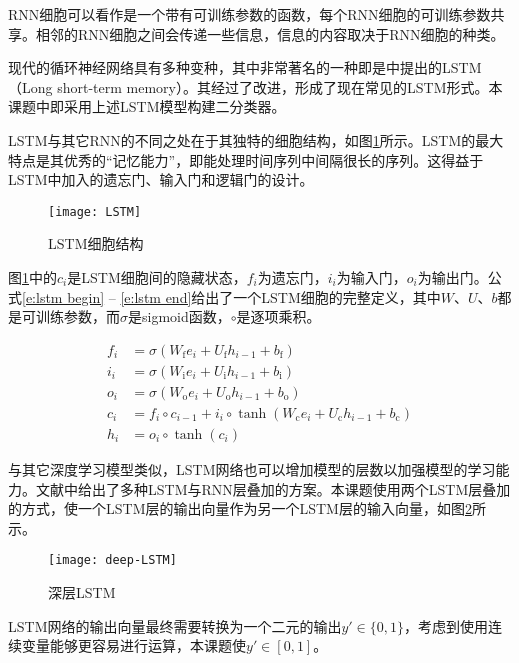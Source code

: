 RNN细胞可以看作是一个带有可训练参数的函数，每个RNN细胞的可训练参数共享。相邻的RNN细胞之间会传递一些信息，信息的内容取决于RNN细胞的种类。

\label{s:classifer lstm}
现代的循环神经网络具有多种变种，其中非常著名的一种即是\cite{Hochreiter1997}中提出的LSTM（Long short-term memory）。其经过了\cite{Gers2000}改进，形成了现在常见的LSTM形式。本课题中即采用上述LSTM模型构建二分类器。

LSTM与其它RNN的不同之处在于其独特的细胞结构，如图\ref{f:lstm}所示。LSTM的最大特点是其优秀的“记忆能力”，即能处理时间序列中间隔很长的序列。这得益于LSTM中加入的遗忘门、输入门和逻辑门的设计。

\begin{figure}[h]
	\centering
	\texttt{[image: LSTM]}
	\caption{LSTM细胞结构}
	\label{f:lstm}
	\vspace{-1em}
\end{figure}

图\ref{f:lstm}中的$c_i$是LSTM细胞间的隐藏状态，$f_i$为遗忘门，$i_i$为输入门，$o_i$为输出门。公式\ref{e:lstm begin} -- \ref{e:lstm end}给出了一个LSTM细胞的完整定义，其中$W$、$U$、$b$都是可训练参数，而$\sigma$是sigmoid函数，$\circ$是逐项乘积。

\begin{align}
f_i &= \sigma(W_\text{f} e_i + U_\text{f} h_{i - 1} + b_\text{f}) \label{e:lstm begin} \\
i_i &= \sigma(W_\text{i} e_i + U_\text{i} h_{i - 1} + b_\text{i}) \\
o_i &= \sigma(W_\text{o} e_i + U_\text{o} h_{i - 1} + b_\text{o}) \\
c_i &= f_i \circ c_{i - 1} + i_i \circ \tanh(W_\text{c} e_i + U_\text{c} h_{i - 1} + b_\text{c}) \\
h_i &= o_i \circ \tanh(c_i) \label{e:lstm end}
\end{align}

与其它深度学习模型类似，LSTM网络也可以增加模型的层数以加强模型的学习能力。文献\cite{Sak2014}中给出了多种LSTM与RNN层叠加的方案。本课题使用两个LSTM层叠加的方式，使一个LSTM层的输出向量作为另一个LSTM层的输入向量，如图\ref{f:deep lstm}所示。

\begin{figure}[h]
	\centering
	\texttt{[image: deep-LSTM]}
	\caption{深层LSTM}
	\label{f:deep lstm}
	\vspace{-1em}
\end{figure}

LSTM网络的输出向量最终需要转换为一个二元的输出$y' \in \{0, 1\}$，考虑到使用连续变量能够更容易进行运算，本课题使$y' \in [0, 1]$。

